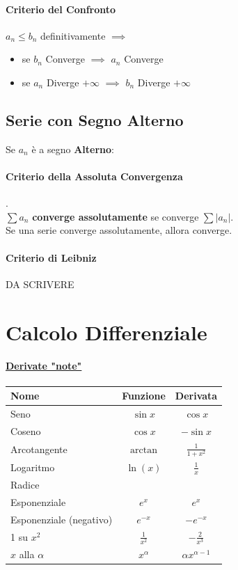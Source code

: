 \documentclass[12pt, a4paper, openany]{book}
\begin{document}
\paragraph*{Criterio del Confronto}
$a_n\leq b_n$ definitivamente $\implies$
\begin{itemize}
	\item se $b_n$ Converge $\implies$  $a_n$ Converge
	\item se $a_n$ Diverge $+\infty$ $\implies$ $b_n$ Diverge $+\infty$
\end{itemize}

\subsection*{Serie con Segno Alterno}
Se $a_n$ è a segno \textbf{Alterno}: 

\paragraph{Criterio della Assoluta Convergenza}.\\
$\sum a_n$ \textbf{converge assolutamente} se converge $\sum |a_n|$.\\
Se una serie converge assolutamente, allora converge.

\paragraph{Criterio di Leibniz}
DA SCRIVERE

\section*{Calcolo Differenziale}

\paragraph*{\underline{Derivate "note"}}
\begin{tabularx}{0.775\textwidth}{|Y|c|c|}
	\hline
	\textbf{Nome}           & \textbf{Funzione} & \textbf{Derivata}     \\
	\hline
	\hline
	Seno                    & $\sin x$          & $\cos x$              \\
	\hline
	Coseno                  & $\cos x$          & $-\sin x$             \\
	\hline
	Arcotangente            & $\arctan$         & $\frac{1}{1+x^2}$     \\
	\hline
	Logaritmo               & $\ln(x) $         & $\frac{1}{x}$         \\
	\hline
	Radice                  &                   &                       \\
	\hline
	Esponenziale            & $e^x$             & $e^x$                 \\
	\hline
	Esponenziale (negativo) & $e^{-x}$          & $ -e^{-x}$            \\
	 su $x^2$              & $\frac{1}{x^2}$   & $-\frac{2}{x^3}$      \\
	\hline
	$x$ alla $\alpha$       & $x^\alpha$        & $\alpha x^{\alpha-1}$ \\
	\hline
\end{tabularx}
\end{document}
